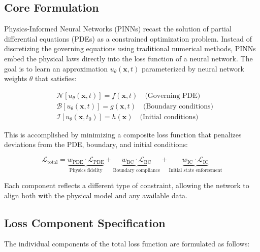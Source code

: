 \documentclass[12pt]{article}
\begin{document}
\subsection{Core Formulation}

Physics-Informed Neural Networks (PINNs) recast the solution of partial differential equations (PDEs) as a constrained optimization problem. Instead of discretizing the governing equations using traditional numerical methods, PINNs embed the physical laws directly into the loss function of a neural network. The goal is to learn an approximation $u_\theta(\mathbf{x}, t)$ parameterized by neural network weights $\theta$ that satisfies:

\begin{align}
    &\mathcal{N}[u_\theta(\mathbf{x}, t)] = f(\mathbf{x}, t) \quad \text{(Governing PDE)} \nonumber \\
    &\mathcal{B}[u_\theta(\mathbf{x}, t)] = g(\mathbf{x}, t) \quad \text{(Boundary conditions)} \nonumber \\
    &\mathcal{I}[u_\theta(\mathbf{x}, t_0)] = h(\mathbf{x}) \quad \text{(Initial conditions)} \nonumber
\end{align}

This is accomplished by minimizing a composite loss function that penalizes deviations from the PDE, boundary, and initial conditions:

\begin{equation}
    \mathcal{L}_{\text{total}} = 
    \underbrace{w_{\text{PDE}} \cdot \mathcal{L}_{\text{PDE}}}_{\text{Physics fidelity}} + 
    \underbrace{w_{\text{BC}} \cdot \mathcal{L}_{\text{BC}}}_{\text{Boundary compliance}} + 
    \underbrace{w_{\text{IC}} \cdot \mathcal{L}_{\text{IC}}}_{\text{Initial state enforcement}}
    \label{eq:total_loss}
\end{equation}

Each component reflects a different type of constraint, allowing the network to align both with the physical model and any available data.

\subsection{Loss Component Specification}

The individual components of the total loss function are formulated as follows:
\end{document}
